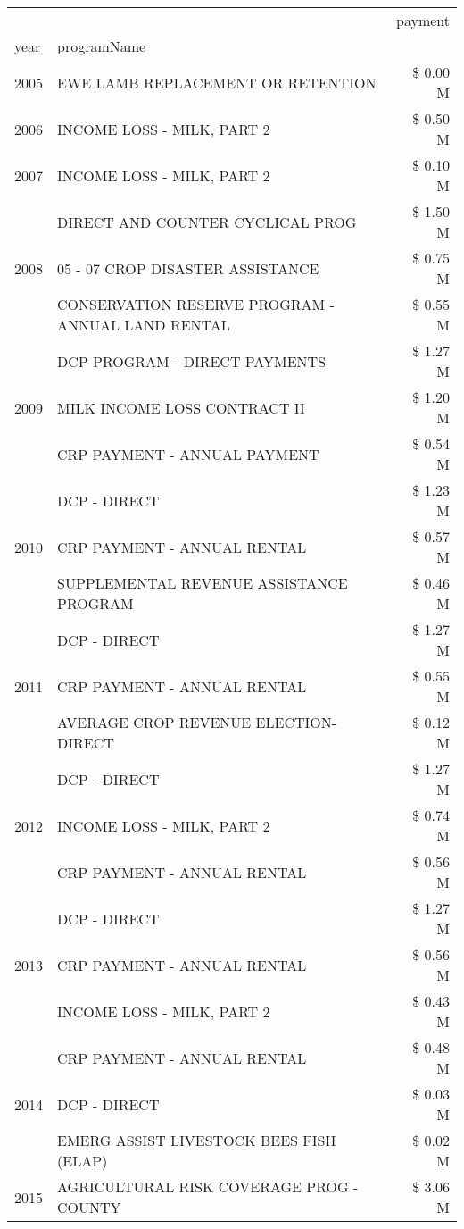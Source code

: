 \begin{tabular}{llr}
\toprule
 &  & payment \\
year & programName &  \\
\midrule
2005 & EWE LAMB REPLACEMENT OR RETENTION & \$ 0.00 M \\
\cline{1-3}
2006 & INCOME LOSS - MILK, PART 2 & \$ 0.50 M \\
\cline{1-3}
2007 & INCOME LOSS - MILK, PART 2 & \$ 0.10 M \\
\cline{1-3}
\multirow[t]{3}{*}{2008} & DIRECT AND COUNTER CYCLICAL PROG & \$ 1.50 M \\
 & 05 - 07 CROP DISASTER ASSISTANCE & \$ 0.75 M \\
 & CONSERVATION RESERVE PROGRAM - ANNUAL LAND RENTAL & \$ 0.55 M \\
\cline{1-3}
\multirow[t]{3}{*}{2009} & DCP PROGRAM - DIRECT PAYMENTS & \$ 1.27 M \\
 & MILK INCOME LOSS CONTRACT II & \$ 1.20 M \\
 & CRP PAYMENT - ANNUAL PAYMENT & \$ 0.54 M \\
\cline{1-3}
\multirow[t]{3}{*}{2010} & DCP - DIRECT & \$ 1.23 M \\
 & CRP PAYMENT - ANNUAL RENTAL & \$ 0.57 M \\
 & SUPPLEMENTAL REVENUE ASSISTANCE PROGRAM & \$ 0.46 M \\
\cline{1-3}
\multirow[t]{3}{*}{2011} & DCP - DIRECT & \$ 1.27 M \\
 & CRP PAYMENT - ANNUAL RENTAL & \$ 0.55 M \\
 & AVERAGE CROP REVENUE ELECTION-DIRECT & \$ 0.12 M \\
\cline{1-3}
\multirow[t]{3}{*}{2012} & DCP - DIRECT & \$ 1.27 M \\
 & INCOME LOSS - MILK, PART 2 & \$ 0.74 M \\
 & CRP PAYMENT - ANNUAL RENTAL & \$ 0.56 M \\
\cline{1-3}
\multirow[t]{3}{*}{2013} & DCP - DIRECT & \$ 1.27 M \\
 & CRP PAYMENT - ANNUAL RENTAL & \$ 0.56 M \\
 & INCOME LOSS - MILK, PART 2 & \$ 0.43 M \\
\cline{1-3}
\multirow[t]{3}{*}{2014} & CRP PAYMENT - ANNUAL RENTAL & \$ 0.48 M \\
 & DCP - DIRECT & \$ 0.03 M \\
 & EMERG ASSIST LIVESTOCK BEES FISH (ELAP) & \$ 0.02 M \\
\cline{1-3}
\multirow[t]{3}{*}{2015} & AGRICULTURAL RISK COVERAGE PROG - COUNTY & \$ 3.06 M \\

\end{tabular}
